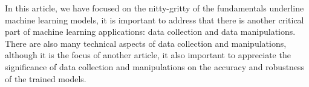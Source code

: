 
In this article, we have focused on the nitty-gritty of the fundamentals underline machine learning models, it is important to address that there is another critical part of machine learning applications: data collection and data manipulations. There are also many technical aspects of data collection and manipulations, although it is the focus of another article, it also important to appreciate the significance of data collection and manipulations on the accuracy and robustness of the trained models.
\par 
